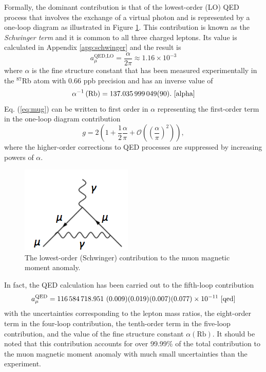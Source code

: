 \documentclass{outhesis}
\begin{document}
Formally, the dominant contribution is that of the lowest-order (LO) QED process that involves the exchange of a virtual photon and is represented by a one-loop diagram as illustrated in Figure \ref{fig:schwinger}. This contribution is known as the \emph{Schwinger term} and it is common to all three charged leptons. Its value is calculated in Appendix \ref{app:schwinger} and the result is 
\begin{equation}
a_{\mu}^{\text{QED,LO}} = \frac{\alpha}{2\pi} \approx 1.16 \times 10^{-3}
\label{eq:schwinger}
\end{equation}
where $\alpha$ is the fine structure constant that has been measured experimentally in the $^{87}$Rb atom with 0.66 ppb precision and has an inverse value of 
\begin{equation}
\alpha^{-1} \left(\text{Rb}\right)= 137.035\,999\,049(90). \,\,\cite{alpha}
\end{equation}
Eq. (\ref{eq:mug}) can be written to first order in $\alpha$ representing the first-order term in the one-loop diagram contribution
\begin{equation}
g = 2\left(1+\frac{1}{2}\frac{\alpha}{\pi}+ \mathcal{O}\left(\left(\frac{\alpha}{\pi}\right)^2\right)\right),
\label{eq:schwinger}
\end{equation}
where the higher-order corrections to QED processes are suppressed by increasing powers of $\alpha$.  
\begin{figure}
  \centering
  \includegraphics[scale=0.5]{figures/schwinger}
   \caption{The lowest-order (Schwinger) contribution to the muon magnetic moment anomaly.}
\label{fig:schwinger}
\end{figure}

In fact, the QED calculation has been carried out to the fifth-loop contribution 
\begin{equation}
a_{\mu}^{\text{QED}} = 116\,584\,718.951 \,\, (0.009)(0.019)(0.007)(0.077) \times 10^{-11} \,\,\cite{qed}
\label{eq:qed}
\end{equation} 
with the uncertainties corresponding to the lepton mass ratios, the eight-order term in the four-loop contribution, the tenth-order term in the five-loop contribution, and the value of the fine structure constant $\alpha \left(\text{Rb}\right)$. It should be noted that this contribution accounts for over 99.99\% of the total contribution to the muon magnetic moment anomaly with much small uncertainties than the experiment.
\end{document}
